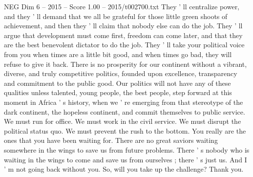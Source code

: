 \begin{textsample}{NEG Dim 6 – 2015 – Score 1.00 – 2015/t002700.txt}
They ' ll centralize power, and they ' ll demand that we all be grateful for those little green shoots of achievement, and then they ' ll claim that nobody else can do the job.
They ' ll argue that development must come first, freedom can come later, and that they are the best benevolent dictator to do the job.
They ' ll take your political voice from you when times are a little bit good, and when times go bad, they will refuse to give it back.
There is no prosperity for our continent without a vibrant, diverse, and truly competitive politics, founded upon excellence, transparency and commitment to the public good.
Our politics will not have any of these qualities unless talented, young people, the best people, step forward at this moment in Africa ' s history, when we ' re emerging from that stereotype of the dark continent, the hopeless continent, and commit themselves to public service.
We must run for office.
We must work in the civil service.
We must disrupt the political status quo.
We must prevent the rush to the bottom.
You really are the ones that you have been waiting for.
There are no great saviors waiting somewhere in the wings to save us from future problems.
There ' s nobody who is waiting in the wings to come and save us from ourselves ; there ' s just us.
And I ' m not going back without you.
So, will you take up the challenge?
Thank you.

\end{textsample}
